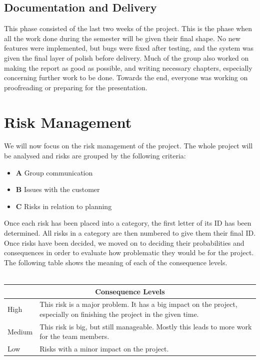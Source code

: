 \subsection{Documentation and Delivery}
\label{subsec:PlanningProjPhasesDocDel}

This phase consisted of the last two weeks of the project. This is the phase when all the work done during the semester will be given their final shape. No new features were implemented, but bugs were fixed after testing, and the system was given the final layer of polish before delivery. Much of the group also worked on making the report as good as possible, and writing necessary chapters, especially concerning further work to be done. Towards the end, everyone was working on proofreading or preparing for the presentation.

\section{Risk Management}
\label{sec:PlanningRiskMan}
We will now focus on the risk management of the project. The whole project will be analysed and risks are grouped by the following criteria:
\begin{itemize}
\item \textbf{A} Group communication
\item \textbf{B} Issues with the customer
\item \textbf{C} Risks in relation to planning
\end{itemize}
Once each risk has been placed into a category, the first letter of its ID has been determined. All risks in a category are then numbered to give them their final ID. Once risks have been decided, we moved on to deciding their probabilities and consequences in order to evaluate how problematic they would be for the project. The following table shows the meaning of each of the consequence levels.\\%
\\%
\begin{minipage}{\linewidth}
\setlength{\tabcolsep}{10pt}
\centering
{}
\begin{tabular}{ |l|p{7cm}| }
	\hline
	\multicolumn{2}{|c|}{\cellcolor{gray!25} Consequence Levels} \\
	\hline
	High & This risk is a major problem. It has a big impact on the project, especially on finishing the project in the given time.\\
	Medium & This risk is big, but still manageable. Mostly this leads to more work for the team members. \\
	Low & Risks with a minor impact on the project. \\
	\hline
\end{tabular}
\end{minipage} \\%
